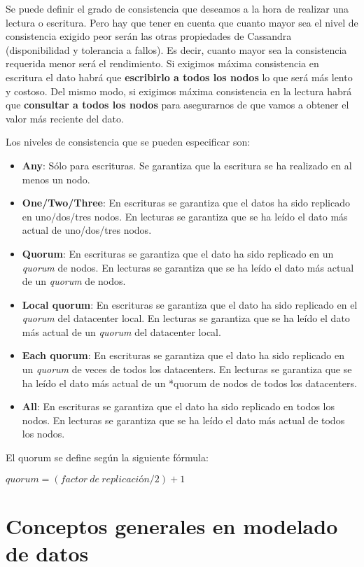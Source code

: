 \documentclass[
]{book}
\providecommand{\tightlist}{%
  \setlength{\itemsep}{0pt}\setlength{\parskip}{0pt}}
\begin{document}
Se puede definir el grado de consistencia que deseamos a la hora de realizar una lectura o escritura. Pero hay que tener en cuenta que cuanto mayor sea el nivel de consistencia exigido peor serán las otras propiedades de Cassandra (disponibilidad y tolerancia a fallos). Es decir, cuanto mayor sea la consistencia requerida menor será el rendimiento. Si exigimos máxima consistencia en escritura el dato habrá que \textbf{escribirlo a todos los nodos} lo que será más lento y costoso. Del mismo modo, si exigimos máxima consistencia en la lectura habrá que \textbf{consultar a todos los nodos} para asegurarnos de que vamos a obtener el valor más reciente del dato.

Los niveles de consistencia que se pueden especificar son:

\begin{itemize}
\tightlist
\item
  \textbf{Any}: Sólo para escrituras. Se garantiza que la escritura se ha realizado en al menos un nodo.
\item
  \textbf{One/Two/Three}: En escrituras se garantiza que el datos ha sido replicado en uno/dos/tres nodos. En lecturas se garantiza que se ha leído el dato más actual de uno/dos/tres nodos.
\item
  \textbf{Quorum}: En escrituras se garantiza que el dato ha sido replicado en un \emph{quorum} de nodos. En lecturas se garantiza que se ha leído el dato más actual de un \emph{quorum} de nodos.
\item
  \textbf{Local quorum}: En escrituras se garantiza que el dato ha sido replicado en el \emph{quorum} del datacenter local. En lecturas se garantiza que se ha leído el dato más actual de un \emph{quorum} del datacenter local.
\item
  \textbf{Each quorum}: En escrituras se garantiza que el dato ha sido replicado en un \emph{quorum} de veces de todos los datacenters. En lecturas se garantiza que se ha leído el dato más actual de un *quorum de nodos de todos los datacenters.
\item
  \textbf{All}: En escrituras se garantiza que el dato ha sido replicado en todos los nodos. En lecturas se garantiza que se ha leído el dato más actual de todos los nodos.
\end{itemize}

El quorum se define según la siguiente fórmula:

\(quorum = ( factor\ de\ replicación / 2) + 1\)

\section{Conceptos generales en modelado de datos}\label{conceptos-generales-en-modelado-de-datos}
\end{document}
